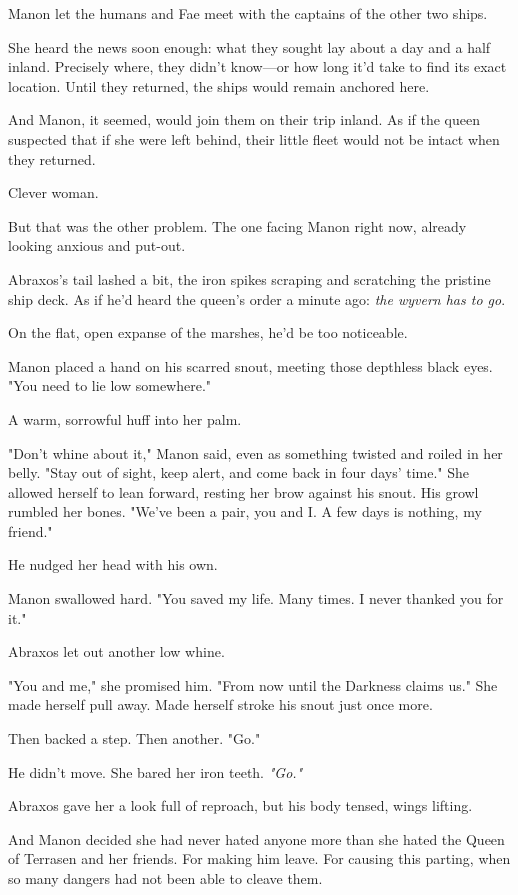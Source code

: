 Manon let the humans and Fae meet with the captains of the other two ships.

She heard the news soon enough: what they sought lay about a day and a half inland.
Precisely where, they didn't know---or how long it'd take to find its exact location.
Until they returned, the ships would remain anchored here.

And Manon, it seemed, would join them on their trip inland.
As if the queen suspected that if she were left behind, their little fleet would not be intact when they returned.

Clever woman.

But that was the other problem.
The one facing Manon right now, already looking anxious and put-out.

Abraxos's tail lashed a bit, the iron spikes scraping and scratching the pristine ship deck.
As if he'd heard the queen's order a minute ago:
\emph{the wyvern has to go}.

On the flat, open expanse of the marshes, he'd be too noticeable.

Manon placed a hand on his scarred snout, meeting those depthless black eyes.
"You need to lie low somewhere."

A warm, sorrowful huff into her palm.

"Don't whine about it," Manon said, even as something twisted and roiled in her belly.
"Stay out of sight, keep alert, and come back in four days' time."
She allowed herself to lean forward, resting her brow against his snout.
His growl rumbled her bones.
"We've been a pair, you and I.
A few days is nothing, my friend."

He nudged her head with his own.

Manon swallowed hard.
"You saved my life.
Many times.
I never thanked you for it."

Abraxos let out another low whine.

"You and me," she promised him.
"From now until the Darkness claims us."
She made herself pull away.
Made herself stroke his snout just once more.

Then backed a step.
Then another.
"Go."

He didn't move.
She bared her iron teeth.
\emph{"Go."}

Abraxos gave her a look full of reproach, but his body tensed, wings lifting.

And Manon decided she had never hated anyone more than she hated the Queen of Terrasen and her friends.
For making him leave.
For causing this parting, when so many dangers had not been able to cleave them.

